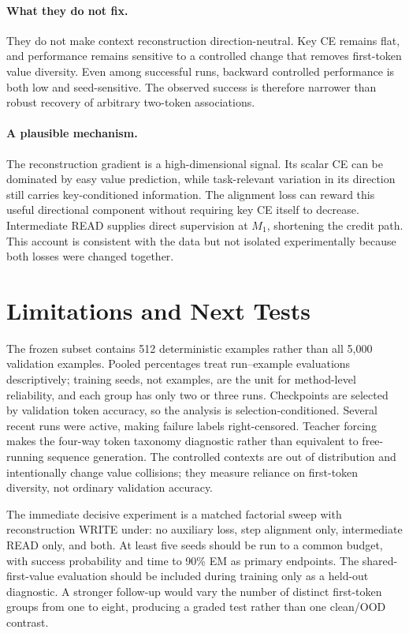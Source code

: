 \documentclass{article}
\begin{document}
\paragraph{What they do not fix.}
They do not make context reconstruction direction-neutral.  Key CE remains flat, and performance remains sensitive to a controlled change that removes first-token value diversity.  Even among successful runs, backward controlled performance is both low and seed-sensitive.  The observed success is therefore narrower than robust recovery of arbitrary two-token associations.

\paragraph{A plausible mechanism.}
The reconstruction gradient is a high-dimensional signal.  Its scalar CE can be dominated by easy value prediction, while task-relevant variation in its direction still carries key-conditioned information.  The alignment loss can reward this useful directional component without requiring key CE itself to decrease.  Intermediate READ supplies direct supervision at $M_1$, shortening the credit path.  This account is consistent with the data but not isolated experimentally because both losses were changed together.

\section{Limitations and Next Tests}

The frozen subset contains 512 deterministic examples rather than all 5,000 validation examples.  Pooled percentages treat run--example evaluations descriptively; training seeds, not examples, are the unit for method-level reliability, and each group has only two or three runs.  Checkpoints are selected by validation token accuracy, so the analysis is selection-conditioned.  Several recent runs were active, making failure labels right-censored.  Teacher forcing makes the four-way token taxonomy diagnostic rather than equivalent to free-running sequence generation.  The controlled contexts are out of distribution and intentionally change value collisions; they measure reliance on first-token diversity, not ordinary validation accuracy.

The immediate decisive experiment is a matched factorial sweep with reconstruction WRITE under: no auxiliary loss, step alignment only, intermediate READ only, and both.  At least five seeds should be run to a common budget, with success probability and time to 90\% EM as primary endpoints.  The shared-first-value evaluation should be included during training only as a held-out diagnostic.  A stronger follow-up would vary the number of distinct first-token groups from one to eight, producing a graded test rather than one clean/OOD contrast.
\end{document}
